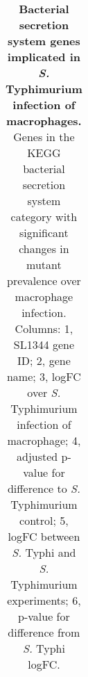 %
\begin{table}
   \tiny
   \centering
   \noindent
    \caption[Bacterial secretion system genes implicated in {\it S.} Typhimurium infection of macrophages]{\textbf{Bacterial secretion system genes implicated in {\it S.} Typhimurium infection of macrophages.} Genes in the KEGG bacterial secretion system category with significant changes in mutant prevalence over macrophage infection. Columns: 1, SL1344 gene ID; 2, gene name; 3, logFC over {\it S.} Typhimurium infection of macrophage; 4, adjusted p-value for difference to {\it S.} Typhimurium control; 5, logFC between {\it S.} Typhi and {\it S.} Typhimurium experiments; 6, p-value for difference from {\it S.} Typhi logFC. }
    \begin{tabular}{ l
    				l
				l
    				c
				c
				c
				c
				}
   

\end{tabular}
\end{table}
